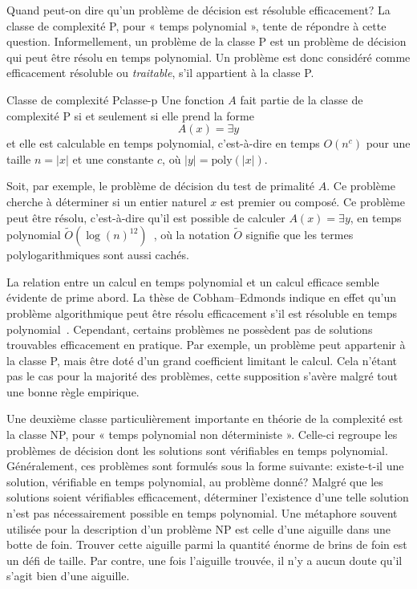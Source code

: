 Quand peut-on dire qu'un problème de décision est résoluble efficacement? La classe de complexité \textsf{P}, pour « temps polynomial », tente de répondre à cette question. Informellement, un problème de la classe \textsf{P} est un problème de décision qui peut être résolu en temps polynomial. Un problème est donc considéré comme efficacement résoluble ou \textit{traitable}, s'il appartient à la classe \textsf{P}. 

\begin{maindefinition}{Classe de complexité \textsf{P}}{classe-p}
    Une fonction $A$ fait partie de la classe de complexité \textsf{P} si et seulement si elle prend la forme 
    \begin{equation*}
        A(x)=\exists y
    \end{equation*}
    et elle est calculable en temps polynomial, c’est-à-dire en temps $O(n^{c})$ pour une taille $n = \lvert x \rvert$ et une constante $c$, où $\lvert y \rvert = \mathrm{poly}(\lvert x \rvert )$.
\end{maindefinition}

Soit, par exemple, le problème de décision du test de primalité $A$. Ce problème cherche à déterminer si un entier naturel $x$ est premier ou composé. Ce problème peut être résolu, c'est-à-dire qu'il est possible de calculer $A(x)=\exists y$, en temps polynomial $\tilde{O}(\log(n)^{12})$~\cite{agrawalPRIMES2004}, où la notation $\tilde{O}$ signifie que les termes polylogarithmiques sont aussi cachés. 

La relation entre un calcul en temps polynomial et un calcul efficace semble évidente de prime abord. La thèse de Cobham–Edmonds indique en effet qu'un problème algorithmique peut être résolu efficacement s'il est résoluble en temps polynomial~\cite{cobhamIntrinsicComputationalDifficulty1965, edmondsPathsTreesFlowers1965}. Cependant, certains problèmes ne possèdent pas de solutions trouvables efficacement en pratique. Par exemple, un problème peut appartenir à la classe \textsf{P}, mais être doté d'un grand coefficient limitant le calcul. Cela n'étant pas le cas pour la majorité des problèmes, cette supposition s'avère malgré tout une bonne règle empirique. 

Une deuxième classe particulièrement importante en théorie de la complexité est la classe \textsf{NP}, pour « temps polynomial non déterministe ». Celle-ci regroupe les problèmes de décision dont les solutions sont vérifiables en temps polynomial. Généralement, ces problèmes sont formulés sous la forme suivante: existe-t-il une solution, vérifiable en temps polynomial, au problème donné? Malgré que les solutions soient vérifiables efficacement, déterminer l'existence d'une telle solution n'est pas nécessairement possible en temps polynomial. Une métaphore souvent utilisée pour la description d'un problème \textsf{NP} est celle d'une aiguille dans une botte de foin. Trouver cette aiguille parmi la quantité énorme de brins de foin est un défi de taille. Par contre, une fois l'aiguille trouvée, il n'y a aucun doute qu'il s'agit bien d'une aiguille. 

